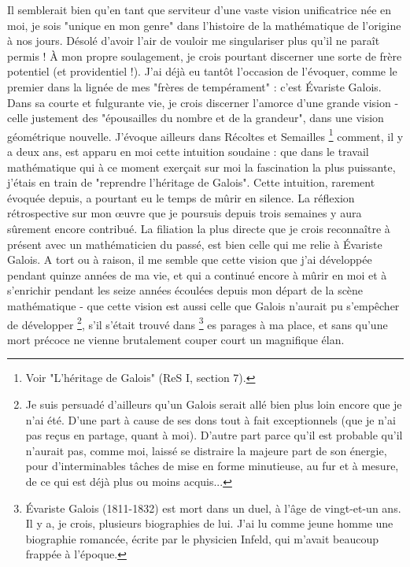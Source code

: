 Il semblerait bien qu'en tant que serviteur d'une vaste vision unificatrice née en moi, je sois "unique en mon genre" dans l'histoire de la mathématique de l'origine à nos jours. Désolé d'avoir l'air de vouloir me singulariser plus qu'il ne paraît permis ! À mon propre soulagement, je crois pourtant discerner une sorte de frère potentiel (et providentiel !). J'ai déjà eu tantôt l'occasion de l'évoquer, comme le premier dans la lignée de mes "frères de tempérament" : c'est Évariste Galois. Dans sa courte et fulgurante vie, je crois discerner l'amorce d'une grande vision - celle justement des "épousailles du nombre et de la grandeur", dans une vision géométrique nouvelle. J'évoque ailleurs dans Récoltes et Semailles \footnote{Voir "L'héritage de Galois" (ReS I, section 7).} comment, il y a deux ans, est apparu en moi cette intuition soudaine : que dans le travail mathématique qui à ce moment exerçait sur moi la fascination la plus puissante, j'étais en train de "reprendre l'héritage de Galois". Cette intuition, rarement évoquée depuis, a pourtant eu le temps de mûrir en silence. La réflexion rétrospective sur mon œuvre que je poursuis depuis trois semaines y aura sûrement encore contribué. La filiation la plus directe que je crois reconnaître à présent avec un mathématicien du passé, est bien celle qui me relie à Évariste Galois. A tort ou à raison, il me semble que cette vision que j'ai développée pendant quinze années de ma vie, et qui a continué encore à mûrir en moi et à s'enrichir pendant les seize années écoulées depuis mon départ de la scène mathématique - que cette vision est aussi celle que Galois n'aurait pu s'empêcher de développer \footnote{Je suis persuadé d'ailleurs qu'un Galois serait allé bien plus loin encore que je n'ai été. D'une part à cause de ses dons tout à fait exceptionnels (que je n'ai pas reçus en partage, quant à moi). D'autre part parce qu'il est probable qu'il n'aurait pas, comme moi, laissé se distraire la majeure part de son énergie, pour d'interminables tâches de mise en forme minutieuse, au fur et à mesure, de ce qui est déjà plus ou moins acquis...}, s'il s'était trouvé dans \footnote{Évariste Galois (1811-1832) est mort dans un duel, à l'âge de vingt-et-un ans. Il y a, je crois, plusieurs biographies de lui. J'ai lu comme jeune homme une biographie romancée, écrite par le physicien Infeld, qui m'avait beaucoup frappée à l'époque.} es parages à ma place, et sans qu'une mort précoce ne vienne brutalement couper court un magnifique élan.

